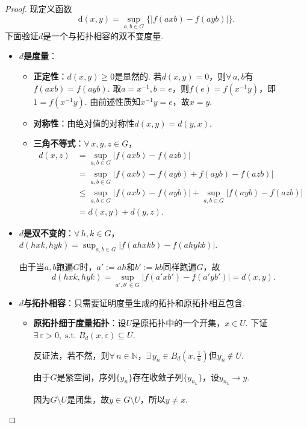 \documentclass[lang=cn,a4paper,11pt,openany,scheme=chinese]{elegantbook}
\renewcommand{\leq}{\leqslant}
\renewcommand{\geq}{\geqslant}
\DeclareMathOperator{\st}{\text{s.t.}}
\begin{document}
\begin{proof}
    现定义函数
    \[
    \mathrm{d}\left( {x,y}\right)  = \mathop{\sup }\limits_{{a,b \in  G}}\{ \left| {f\left( {axb}\right)  - f\left( {ayb}\right) }\right| \} .
    \]
    下面验证$d$是一个与拓扑相容的双不变度量.
    \begin{itemize}
        \item \textbf{$d$是度量}：
        \begin{itemize}
            \item \textbf{正定性}：$d(x,y)\geq 0$是显然的. 若$d(x,y)=0$，则$\forall\, a,b$有$f(axb)=f(ayb)$. 取$a=x^{-1},b=e$，则$f(e)=f(x^{-1}y)$，即$1=f(x^{-1}y)$. 由前述性质知$x^{-1}y=e$，故$x=y$.
            \item \textbf{对称性}：由绝对值的对称性$d(x,y)=d(y,x)$.
            \item \textbf{三角不等式}：$\forall\, x,y,z\in G$，
            \begin{align*}
                d(x,z) &= \sup_{a,b\in G} |f(axb)-f(azb)| \\
                &= \sup_{a,b\in G} |f(axb)-f(ayb) + f(ayb)-f(azb)| \\
                &\leq \sup_{a,b\in G} |f(axb)-f(ayb)| + \sup_{a,b\in G} |f(ayb)-f(azb)| \\
                &= d(x,y)+d(y,z).
            \end{align*}
        \end{itemize}
        \item \textbf{$d$是双不变的}：$\forall\, h,k\in G$，$d(hxk,hyk) = \sup_{a,b\in G} |f(ahxkb)-f(ahykb)|$.\par
        由于当$a,b$跑遍$G$时，$a':=ah$和$b':=kb$同样跑遍$G$，故
        \[
        d(hxk,hyk) = \sup_{a',b'\in G} |f(a'xb')-f(a'yb')| = d(x,y).
        \]
        \item \textbf{$d$与拓扑相容}：只需要证明度量生成的拓扑和原拓扑相互包含.
        \begin{itemize}
            \item \textbf{原拓扑细于度量拓扑}：设$U$是原拓扑中的一个开集，$x\in U$. 下证$\exists\,\varepsilon>0,\st B_d(x,\varepsilon)\subseteq U$.\par
            反证法，若不然，则$\forall\, n\in\mathbb{N}$，$\exists\, y_n\in B_d\left(x,\frac{1}{n}\right)$但$y_n\notin U$.\par
            由于$G$是紧空间，序列$\{y_n\}$存在收敛子列$\{y_{n_k}\}$，设$y_{n_k}\to y$.\par
            因为$G\setminus U$是闭集，故$y\in G\setminus U$，所以$y\neq x$.\par

\end{itemize}
\end{itemize}
\end{proof}
\end{document}
